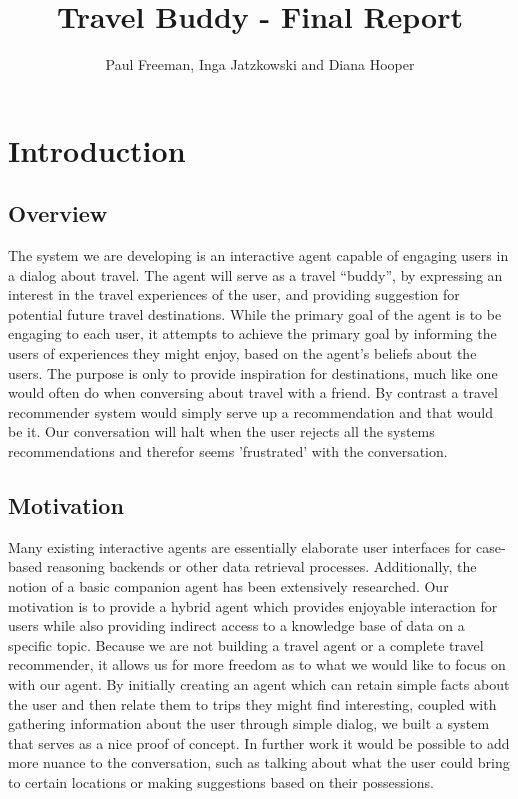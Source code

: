 \documentclass[11pt]{article} %
\title{Travel Buddy - Final Report}
\author{Paul Freeman, Inga Jatzkowski and Diana Hooper}
\begin{document}
\maketitle
\newpage
\section{Introduction}
\subsection{Overview}
The system we are developing is an interactive agent capable of
engaging users in a dialog about travel. The agent will serve as
a travel ``buddy'', by expressing an interest in the travel
experiences of the user, and providing suggestion for potential future travel destinations. While the primary goal of the agent is
to be engaging to each user, it attempts to achieve the primary
goal by informing the users of experiences they might enjoy,
based on the agent's beliefs about the users. The purpose is only to provide inspiration for destinations, much like one would often do when conversing about travel with a friend. By contrast a travel recommender system would simply serve up a recommendation and that would be it. Our conversation will halt when the user rejects all the systems recommendations and therefor seems 'frustrated' with the conversation.

\subsection{Motivation}
Many existing interactive agents are essentially elaborate user
interfaces for case-based reasoning backends or other data retrieval
processes. Additionally, the notion of a basic companion agent has been
extensively researched. Our motivation is to provide a hybrid agent
which provides enjoyable interaction for users while also providing
indirect access to a knowledge base of data on a specific topic.
Because we are not building a travel agent or a complete travel recommender,
it allows us for more freedom as to what we would like to focus on with our agent. By initially 
creating an agent which can retain simple facts about the user and then relate them to trips 
they might find interesting, coupled with gathering information about the user through simple dialog, we built a system that serves as a nice proof of concept. In further work it would be possible to add more nuance to the conversation, such as talking about what the user could bring to certain locations or making suggestions based on their possessions.
\end{document}
